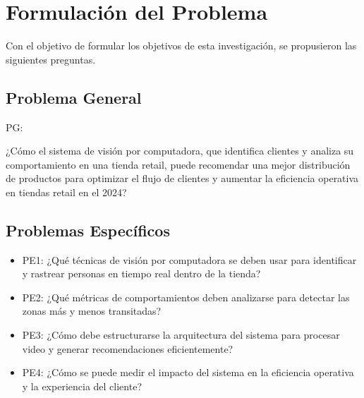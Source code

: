 





\section{Formulación del Problema}
Con el objetivo de formular los objetivos de esta investigación, se propusieron las siguientes preguntas.
\subsection{Problema General}
PG:\newcommand{\ProblemaGeneral}{
	¿Cómo el sistema de visión por computadora, que identifica clientes y analiza su comportamiento en una tienda retail, puede recomendar una mejor distribución de productos para optimizar el flujo de clientes y aumentar la eficiencia operativa en tiendas retail en el 2024?
}
\ProblemaGeneral
\subsection{Problemas Espec\'{i}ficos}
\newcommand{\Pbone}{
¿Qué técnicas de visión por computadora se deben usar para identificar y rastrear personas en tiempo real dentro de la tienda?
}
\newcommand{\Pbtwo}{
¿Qué métricas de comportamientos deben analizarse para detectar las zonas más y menos transitadas?
}
\newcommand{\Pbthree}{
¿Cómo debe estructurarse la arquitectura del sistema para procesar video y generar recomendaciones eficientemente?
}
\newcommand{\Pbfour}{
¿Cómo se puede medir el impacto del sistema en la eficiencia operativa y la experiencia del cliente?
}

\begin{itemize}
    \item PE1: {\Pbone}
	\item PE2: {\Pbtwo}
	\item PE3: {\Pbthree}
	\item PE4: {\Pbfour}
\end{itemize}

